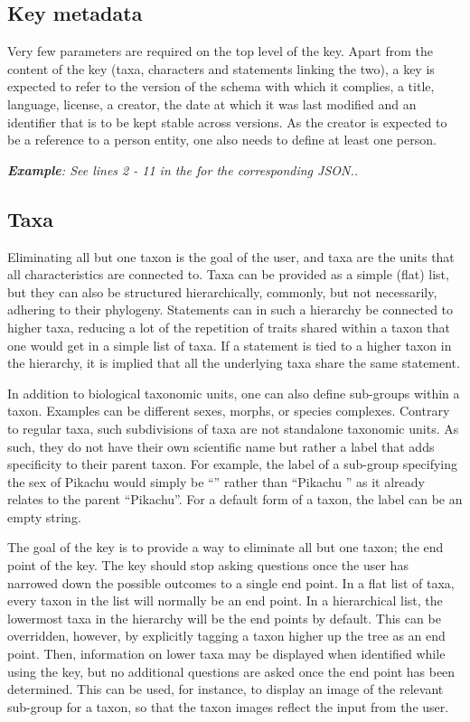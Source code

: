 \documentclass[10pt,letterpaper]{article}
\begin{document}
\subsection*{
Key metadata
}
Very few parameters are required on the top level of the key. Apart from the content of the key (taxa, characters and statements linking the two), a key is expected to refer to the version of the schema with which it complies, a title, language, license, a creator, the date at which it was last modified and an identifier that is to be kept stable across versions. As the creator is expected to be a reference to a person entity, one also needs to define at least one person.

\textit{\textbf{Example}: See lines 2 - 11 in the  for the corresponding JSON..}

\subsection*{
Taxa
}
Eliminating all but one taxon is the goal of the user, and taxa are the units that all characteristics are connected to. Taxa can be provided as a simple (flat) list, but they can also be structured hierarchically, commonly, but not necessarily, adhering to their phylogeny. Statements can in such a hierarchy be connected to higher taxa, reducing a lot of the repetition of traits shared within a taxon that one would get in a simple list of taxa. If a statement is tied to a higher taxon in the hierarchy, it is implied that all the underlying taxa share the same statement.

In addition to biological taxonomic units, one can also define sub-groups within a taxon. Examples can be different sexes, morphs, or species complexes. Contrary to regular taxa, such subdivisions of taxa are not standalone taxonomic units. As such, they do not have their own scientific name but rather a label that adds specificity to their parent taxon. For example, the label of a sub-group specifying the sex of Pikachu would simply be ``\Female'' rather than ``Pikachu \Female'' as it already relates to the parent ``Pikachu''. For a default form of a taxon, the label can be an empty string.

The goal of the key is to provide a way to eliminate all but one taxon; the end point of the key.  The key should stop asking questions once the user has narrowed down the possible outcomes to a single end point. In a flat list of taxa, every taxon in the list will normally be an end point. In a hierarchical list, the lowermost taxa in the hierarchy will be the end points by default. This can be overridden, however, by explicitly tagging a taxon higher up the tree as an end point. Then, information on lower taxa may be displayed when identified while using the key, but no additional questions are asked once the end point has been determined. This can be used, for instance, to display an image of the relevant sub-group for a taxon, so that the taxon images reflect the input from the user.
\end{document}
